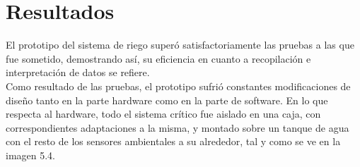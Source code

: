 \begin{comment} 
Se puede observar en la imagen \ref{evento1} que, cuando el sensor de humedad del suelo reporta valores altos, el riego se detiene en el momento. 

\begin{figure}[H]
	\begin{center}
		\subfigure[Detecci\'on de un nivel alto de humedad del suelo.]{\texttt{[image: r4]}}
		\subfigure[Riego detenido.]{\texttt{[image: r4]}}
	\end{center}
	\label{evento1}
	\caption{Primera evento considerado.}
\end{figure} 

En caso de que se detecten valores bajos de humedad en el suelo como en la imagen \ref{evento2}, el riego dar\'a inicio de manera autom\'atica. 

\begin{figure}[H]
	\begin{center}
		\subfigure[Detecci\'on de un nivel bajo de humedad del suelo.]{\texttt{[image: r4]}}
		\subfigure[Riego detenido.]{\texttt{[image: r4]}}
	\end{center}
	\label{evento2}
	\caption{Segundo evento considerado.}
\end{figure} 

Otra forma de detener el flujo de agua, es detectando un nivel de agua bajo parecido al de la imagen \ref{event3}.  

\begin{figure}[H]
	\begin{center}
		\subfigure[Detecci\'on de un bajo nivel de agua.]{\texttt{[image: r4]}}
		\subfigure[Riego detenido.]{\texttt{[image: r4]}}
	\end{center}
	\label{event3}
	\caption{Tercer evento considerado.}
\end{figure} 

\end{comment}

\section{Resultados}
El prototipo del sistema de riego super\'o satisfactoriamente las pruebas a las que fue sometido, demostrando as\'i, su eficiencia en cuanto a recopilaci\'on e interpretaci\'on de datos se refiere.\\ 
Como resultado de las pruebas, el prototipo sufri\'o constantes modificaciones de dise\~{n}o tanto en la parte hardware como en la parte de software. En lo que respecta al hardware, todo el sistema cr\'itico fue aislado en una caja, con correspondientes adaptaciones a la misma, y montado sobre un tanque de agua con el resto de los sensores ambientales a su alrededor, tal y como se ve en la imagen 5.4.%

